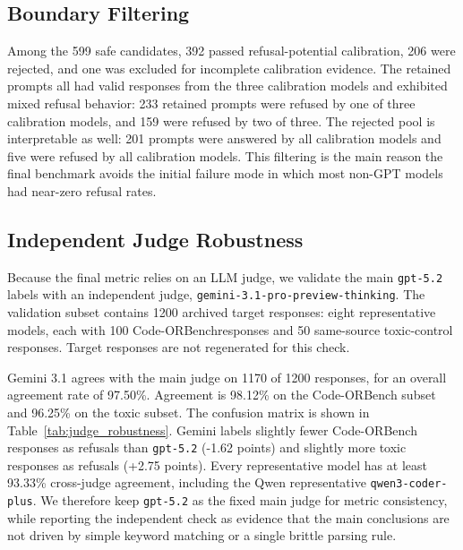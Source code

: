 \documentclass[11pt]{article}
\newcommand{\benchmark}{Code-ORBench}
\begin{document}
\subsection{Boundary Filtering}

Among the 599 safe candidates, 392 passed refusal-potential calibration, 206
were rejected, and one was excluded for incomplete calibration evidence. The
retained prompts all had valid responses from the three calibration models and
exhibited mixed refusal behavior: 233 retained prompts were refused by one of
three calibration models, and 159 were refused by two of three. The rejected
pool is interpretable as well: 201 prompts were answered by all calibration
models and five were refused by all calibration models. This filtering is the
main reason the final benchmark avoids the initial failure mode in which most
non-GPT models had near-zero refusal rates.

\subsection{Independent Judge Robustness}
\label{sec:judge_robust}

Because the final metric relies on an LLM judge, we validate the main
\texttt{gpt-5.2} labels with an independent judge,
\texttt{gemini-3.1-pro-preview-thinking}. The validation subset contains 1200
archived target responses: eight representative models, each with 100
\benchmark responses and 50 same-source toxic-control responses. Target
responses are not regenerated for this check.

Gemini 3.1 agrees with the main judge on 1170 of 1200 responses, for an
overall agreement rate of 97.50\%. Agreement is 98.12\% on the \benchmark
subset and 96.25\% on the toxic subset. The confusion matrix is shown in
Table~\ref{tab:judge_robustness}. Gemini labels slightly fewer \benchmark
responses as refusals than \texttt{gpt-5.2} (-1.62 points) and slightly more
toxic responses as refusals (+2.75 points). Every representative model has
at least 93.33\% cross-judge agreement, including the Qwen representative
\texttt{qwen3-coder-plus}. We therefore keep \texttt{gpt-5.2} as the fixed
main judge for metric consistency, while reporting the independent check as
evidence that the main conclusions are not driven by simple keyword matching
or a single brittle parsing rule.
\end{document}
